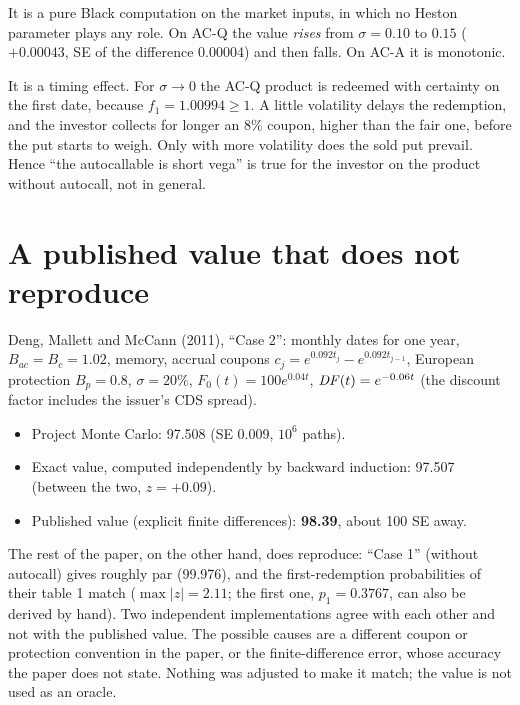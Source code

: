 It is a pure Black computation on the market inputs, in which no Heston parameter plays any role. On \mbox{AC-Q} the
value \emph{rises} from $\sigma=0.10$ to $0.15$ ($+0.00043$, SE of the difference 0.00004) and then falls. On
\mbox{AC-A} it is monotonic.
\begin{perche}[title={Why vega changes sign}]
It is a timing effect. For $\sigma\to0$ the \mbox{AC-Q} product is redeemed with certainty on the first date, because
$f_1=1.00994\ge1$. A little volatility delays the redemption, and the investor collects for longer an 8\% coupon,
higher than the fair one, before the put starts to weigh. Only with more volatility does the sold put prevail. Hence
``the autocallable is short vega'' is true for the investor on the product without autocall, not in general.
\end{perche}

\section{A published value that does not reproduce}
Deng, Mallett and McCann (2011), ``Case 2'': monthly dates for one year, $B_{ac}=B_c=1.02$, memory, accrual coupons
$c_j=e^{0.092t_j}-e^{0.092t_{j-1}}$, European protection $B_p=0.8$, $\sigma=20\%$, $F_0(t)=100e^{0.04t}$,
$\mathit{DF}(t)=e^{-0.06t}$ (the discount factor includes the issuer's CDS spread).
\begin{itemize}
\item Project Monte Carlo: 97.508 (SE 0.009, $10^6$ paths).
\item Exact value, computed independently by backward induction: 97.507 (between the two, $z=+0.09$).
\item Published value (explicit finite differences): \textbf{98.39}, about 100 SE away.
\end{itemize}
The rest of the paper, on the other hand, does reproduce: ``Case 1'' (without autocall) gives roughly par (99.976),
and the first-redemption probabilities of their table 1 match ($\max|z|=2.11$; the first one, $p_1=0.3767$, can also
be derived by hand). Two independent implementations agree with each other and not with the published value. The
possible causes are a different coupon or protection convention in the paper, or the finite-difference error, whose
accuracy the paper does not state. Nothing was adjusted to make it match; the value is not used as an oracle.

